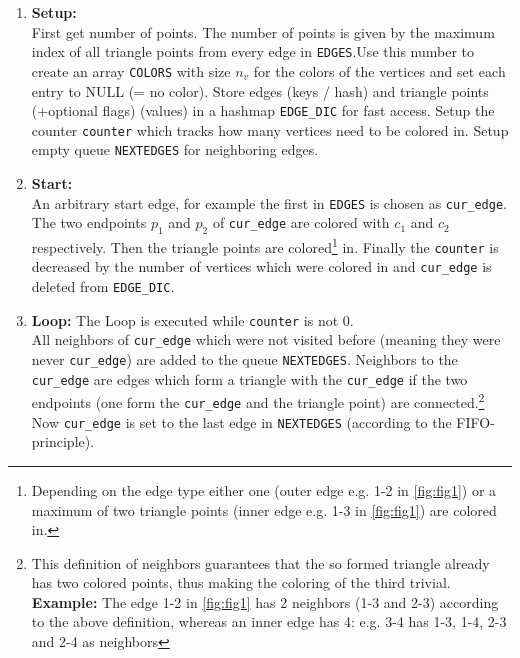 \documentclass[english]{scrartcl}
\newcommand{\code}{\texttt}
\begin{document}
\begin{enumerate}
    \item \textbf{Setup:}\\ First get number of points. The number of points is given by the maximum index of all triangle points from every edge in \code{EDGES}.Use this number to create an array \code{COLORS} with size $n_v$ for the colors of the vertices and set each entry to NULL (= no color). Store edges (keys / hash) and triangle points (+optional flags) %
    (values) in a hashmap \code{EDGE\_DIC} for fast access. Setup the counter \code{counter} which tracks how many vertices need to be colored in. Setup empty queue \code{NEXTEDGES} for neighboring edges.
    \item \textbf{Start:}\\ An arbitrary start edge, for example the first in \code{EDGES} is chosen as \code{cur\_edge}. The two endpoints $p_1$ and $p_2$ of \code{cur\_edge} are colored with $c_1$ and $c_2$ respectively. Then the triangle points are colored\footnote{Depending on the edge type either one (outer edge e.g. 1-2 in \autoref{fig:fig1}) or a maximum of two triangle points (inner edge e.g. 1-3 in \autoref{fig:fig1}) are colored in.} in. Finally the \code{counter} is decreased by the number of vertices which were colored in and \code{cur\_edge} is deleted from \code{EDGE\_DIC}.  
    \item \textbf{Loop:} The Loop is executed while \code{counter} is not 0. \\ All neighbors of \code{cur\_edge} which were not visited before (meaning they were never \code{cur\_edge}) are added to the queue \code{NEXTEDGES}. Neighbors to the \code{cur\_edge} are edges which form a triangle with the \code{cur\_edge} if the two endpoints (one form the \code{cur\_edge} and the triangle point) are connected.\footnote{This definition of neighbors guarantees that the so formed triangle already has two colored points, thus making the coloring of the third trivial. \\ \textbf{Example:} The edge 1-2 in \autoref{fig:fig1} has 2 neighbors (1-3 and 2-3) according to the above definition, whereas an inner edge has 4: e.g. 3-4 has 1-3, 1-4, 2-3 and 2-4 as neighbors} 
    Now \code{cur\_edge} is set to the last edge in \code{NEXTEDGES} (according to the FIFO-principle). 

\end{enumerate}
\end{document}
